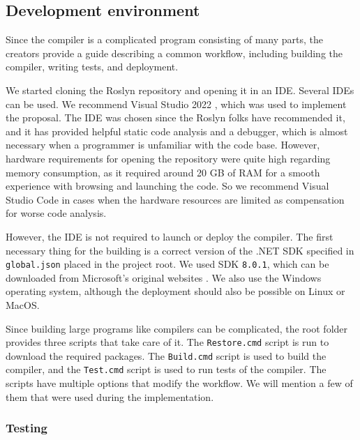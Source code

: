 \subsection{Development environment}

Since the compiler is a complicated program consisting of many parts, the creators provide a guide \cite{online:roslynGuide} describing a common workflow, including building the compiler, writing tests, and deployment.
\par
We started cloning the Roslyn repository \cite{online:roslynRepo} and opening it in an IDE.
Several IDEs can be used. We recommend Visual Studio 2022 \cite{online:vs}, which was used to implement the proposal. 
The IDE was chosen since the Roslyn folks have recommended it, and it has provided helpful static code analysis and a debugger, which is almost necessary when a programmer is unfamiliar with the code base. 
However, hardware requirements for opening the repository were quite high regarding memory consumption, as it required around 20 GB of RAM for a smooth experience with browsing and launching the code. 
So we recommend Visual Studio Code \cite{online:vsCode} in cases when the hardware resources are
limited as compensation for worse code analysis.
\par
However, the IDE is not required to launch or deploy the compiler.
The first necessary thing for the building is a correct version of the .NET SDK specified in \texttt{global.json} placed in the project root. 
We used SDK \texttt{8.0.1}, which can be downloaded from Microsoft's original websites \cite{online:sdk}. 
We also use the Windows operating system, although the deployment should also be possible on Linux or MacOS.
\par
Since building large programs like compilers can be complicated, the root folder provides three scripts that take care of it. 
The \texttt{Restore.cmd} script is run to download the required packages. 
The \texttt{Build.cmd} script is used to build the compiler, and the \texttt{Test.cmd} script is used to run tests of the compiler. 
The scripts have multiple options that modify the workflow. We will mention a few of them that were used during the implementation.

\subsubsection{Testing}

